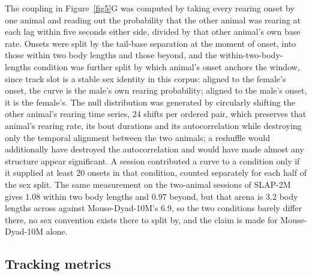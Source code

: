 \documentclass[pdflatex, sn-nature]{sn-jnl}
\theoremstyle{thmstyleone}%
\theoremstyle{thmstyletwo}%
\theoremstyle{thmstylethree}%
\begin{document}
The coupling in Figure~\ref{fig5}G was computed by taking every rearing onset by one animal and reading out the probability that the other animal was rearing at each lag within five seconds either side, divided by that other animal's own base rate. Onsets were split by the tail-base separation at the moment of onset, into those within two body lengths and those beyond, and the within-two-body-lengths condition was further split by which animal's onset anchors the window, since track slot is a stable sex identity in this corpus: aligned to the female's onset, the curve is the male's own rearing probability; aligned to the male's onset, it is the female's. The null distribution was generated by circularly shifting the other animal's rearing time series, 24 shifts per ordered pair, which preserves that animal's rearing rate, its bout durations and its autocorrelation while destroying only the temporal alignment between the two animals; a reshuffle would additionally have destroyed the autocorrelation and would have made almost any structure appear significant. A session contributed a curve to a condition only if it supplied at least 20 onsets in that condition, counted separately for each half of the sex split. The same measurement on the two-animal sessions of SLAP-2M gives 1.08 within two body lengths and 0.97 beyond, but that arena is 3.2 body lengths across against Mouse-Dyad-10M's 6.9, so the two conditions barely differ there, no sex convention exists there to split by, and the claim is made for Mouse-Dyad-10M alone.

\subsection{Tracking metrics}\label{methods-tracking}
\end{document}

